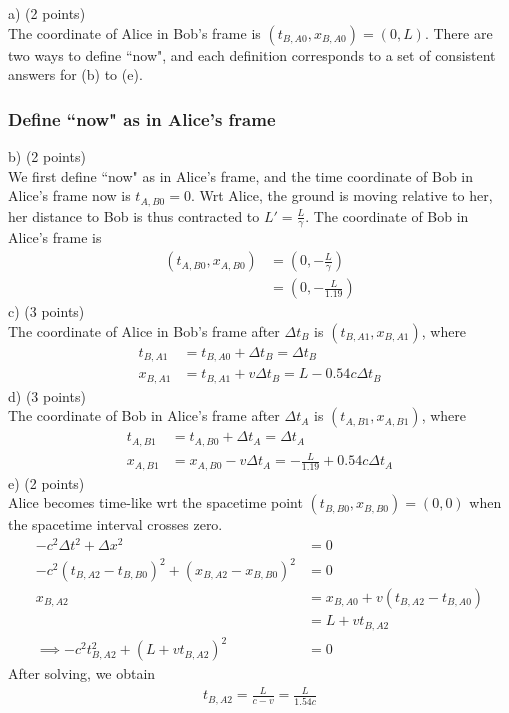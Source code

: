 \documentclass[12pt]{book} %
\numberwithin{equation}{chapter}
\def\c{\gamma}
\def\D{\Delta}
\begin{document}
\begin{solbox}
a) (2 points)\\
The coordinate of Alice in Bob's frame is $\left(t_{B, A0}, x_{B, A0}\right)=(0, L)$.\bigskip\newline
There are two ways to define ``now", and each definition corresponds to a set of consistent answers for (b) to (e).
\subsubsection{Define ``now" as in Alice's frame}
b) (2 points)\\
We first define ``now" as in Alice's frame, and the time coordinate of Bob in Alice's frame now is $t_{A, B0}=0$. Wrt Alice, the ground is moving relative to her, her distance to Bob is thus contracted to $L'=\frac{L}{\c}$. The coordinate of Bob in Alice's frame is
\begin{align*}
\left(t_{A, B0}, x_{A, B0}\right)&=\left(0, -\frac{L}{\c}\right)\\
&=\left(0, -\frac{L}{1.19}\right)
\end{align*}
c) (3 points)\\
The coordinate of Alice in Bob's frame after $\D t_{B}$ is $\left(t_{B, A1}, x_{B, A1}\right)$, where
\begin{align*}
t_{B, A1}&=t_{B, A0}+\D t_{B}=\D t_{B}\\
x_{B, A1}&=t_{B, A1}+v\D t_{B}=L-0.54c\D t_{B}
\end{align*}
d) (3 points)\\
The coordinate of Bob in Alice's frame after $\D t_{A}$ is $\left(t_{A, B1}, x_{A, B1}\right)$, where
\begin{align*}
t_{A, B1}&=t_{A, B0}+\D t_{A}=\D t_{A}\\
x_{A, B1}&=x_{A, B0}-v\D t_{A}=-\frac{L}{1.19}+0.54c\D t_{A}
\end{align*}
e) (2 points)\\
Alice becomes time-like wrt the spacetime point $\left(t_{B, B0}, x_{B, B0}\right)=(0, 0)$ when the spacetime interval crosses zero.
\begin{align*}
-c^{2}\D t^{2}+\D x^{2}&=0\\
-c^{2}\left(t_{B, A2}-t_{B, B0}\right)^{2}+\left(x_{B, A2}-x_{B, B0}\right)^{2}&=0\\
x_{B, A2}&=x_{B, A0}+v\left(t_{B, A2}-t_{B, A0}\right)\\
&=L+vt_{B, A2}\\
\implies -c^{2}t_{B, A2}^{2}+\left(L+vt_{B, A2}\right)^{2}&=0
\end{align*}
After solving, we obtain
\begin{align*}
t_{B, A2}=\frac{L}{c-v}=\frac{L}{1.54c}
\end{align*}


\end{solbox}
\end{document}
